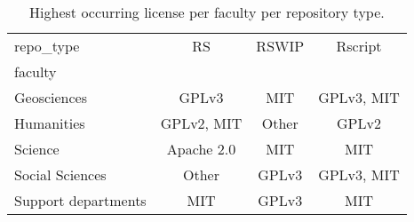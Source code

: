 \begin{table}
\centering
\caption{Highest occurring license per faculty per repository type.}
\label{tab:highest_license}
\begin{tabular}{lccc}
\toprule
repo\_type &          RS &  RSWIP &     Rscript \\
faculty             &             &        &             \\
\midrule
Geosciences         &       GPLv3 &    MIT &  GPLv3, MIT \\
Humanities          &  GPLv2, MIT &  Other &       GPLv2 \\
Science             &  Apache 2.0 &    MIT &         MIT \\
Social Sciences     &       Other &  GPLv3 &  GPLv3, MIT \\
Support departments &         MIT &  GPLv3 &         MIT \\
\bottomrule
\end{tabular}
\end{table}
